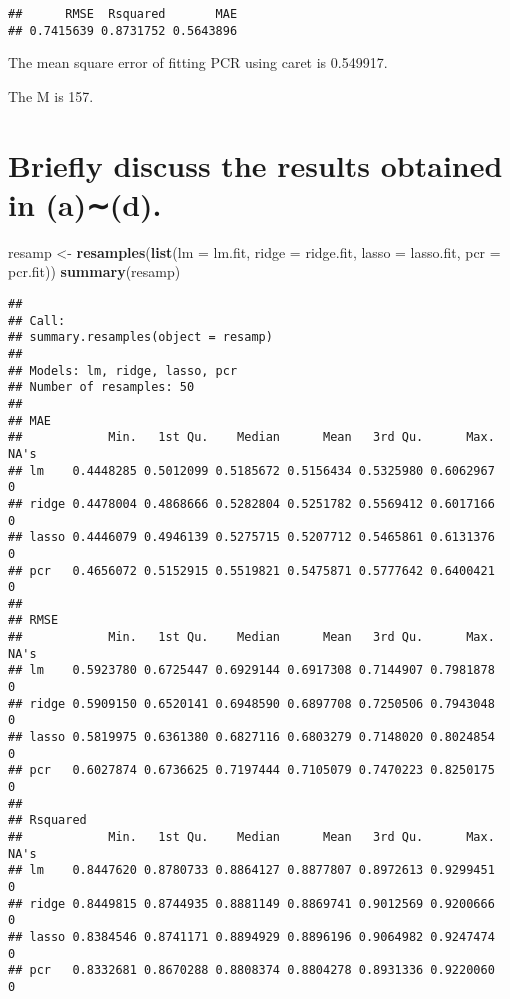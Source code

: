 \documentclass[]{article}
\newenvironment{Shaded}{\begin{snugshade}}{\end{snugshade}}
\newcommand{\DataTypeTok}[1]{\textcolor[rgb]{0.13,0.29,0.53}{#1}}
\newcommand{\KeywordTok}[1]{\textcolor[rgb]{0.13,0.29,0.53}{\textbf{#1}}}
\newcommand{\NormalTok}[1]{#1}
\newcommand{\OperatorTok}[1]{\textcolor[rgb]{0.81,0.36,0.00}{\textbf{#1}}}
\newcommand{\StringTok}[1]{\textcolor[rgb]{0.31,0.60,0.02}{#1}}
\begin{document}
\begin{Shaded}
\end{Shaded}

\begin{verbatim}
##      RMSE  Rsquared       MAE 
## 0.7415639 0.8731752 0.5643896
\end{verbatim}

The mean square error of fitting PCR using caret is 0.549917.

The M is 157.

\hypertarget{briey-discuss-the-results-obtained-in-ad.}{%
\section{Brieﬂy discuss the results obtained in
(a)∼(d).}\label{briey-discuss-the-results-obtained-in-ad.}}

\begin{Shaded}
\begin{Highlighting}[]
\NormalTok{resamp <-}\StringTok{ }\KeywordTok{resamples}\NormalTok{(}\KeywordTok{list}\NormalTok{(}\DataTypeTok{lm =}\NormalTok{ lm.fit,}
                         \DataTypeTok{ridge =}\NormalTok{ ridge.fit,}
                         \DataTypeTok{lasso =}\NormalTok{ lasso.fit,}
                         \DataTypeTok{pcr =}\NormalTok{ pcr.fit))}
\KeywordTok{summary}\NormalTok{(resamp)}
\end{Highlighting}
\end{Shaded}

\begin{verbatim}
## 
## Call:
## summary.resamples(object = resamp)
## 
## Models: lm, ridge, lasso, pcr 
## Number of resamples: 50 
## 
## MAE 
##            Min.   1st Qu.    Median      Mean   3rd Qu.      Max. NA's
## lm    0.4448285 0.5012099 0.5185672 0.5156434 0.5325980 0.6062967    0
## ridge 0.4478004 0.4868666 0.5282804 0.5251782 0.5569412 0.6017166    0
## lasso 0.4446079 0.4946139 0.5275715 0.5207712 0.5465861 0.6131376    0
## pcr   0.4656072 0.5152915 0.5519821 0.5475871 0.5777642 0.6400421    0
## 
## RMSE 
##            Min.   1st Qu.    Median      Mean   3rd Qu.      Max. NA's
## lm    0.5923780 0.6725447 0.6929144 0.6917308 0.7144907 0.7981878    0
## ridge 0.5909150 0.6520141 0.6948590 0.6897708 0.7250506 0.7943048    0
## lasso 0.5819975 0.6361380 0.6827116 0.6803279 0.7148020 0.8024854    0
## pcr   0.6027874 0.6736625 0.7197444 0.7105079 0.7470223 0.8250175    0
## 
## Rsquared 
##            Min.   1st Qu.    Median      Mean   3rd Qu.      Max. NA's
## lm    0.8447620 0.8780733 0.8864127 0.8877807 0.8972613 0.9299451    0
## ridge 0.8449815 0.8744935 0.8881149 0.8869741 0.9012569 0.9200666    0
## lasso 0.8384546 0.8741171 0.8894929 0.8896196 0.9064982 0.9247474    0
## pcr   0.8332681 0.8670288 0.8808374 0.8804278 0.8931336 0.9220060    0
\end{verbatim}
\end{document}
